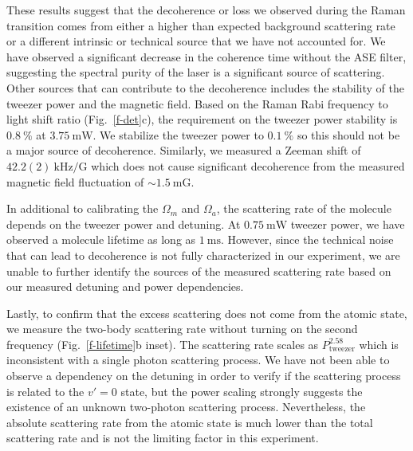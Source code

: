 \documentclass[aps,prl,twocolumn,10pt,superscriptaddress]{revtex4-1}
\newcommand{\todo}[1]{}
\begin{document}
\todo{change scattering to decoherence? since the fluctuation of light shift
  does not lead to scattering but only decherence.}
These results suggest that the decoherence or loss we observed during the Raman transition
comes from either a higher than expected background scattering rate
or a different intrinsic or technical source that we have not accounted for.
We have observed a significant decrease in the coherence time without the ASE filter,
suggesting the spectral purity of the laser is a significant source of scattering.
Other sources that can contribute to the decoherence includes
the stability of the tweezer power and the magnetic field.
Based on the Raman Rabi frequency to light shift ratio (Fig.~\ref{f-det}c),
the requirement on the tweezer power stability is $0.8~\mathrm{\%}$ at $3.75~\mathrm{mW}$.
We stabilize the tweezer power to $0.1~\mathrm{\%}$ so this should not be a major source
of decoherence.
Similarly, we measured a Zeeman shift of $42.2(2)~\mathrm{kHz/G}$
which does not cause significant decoherence from the measured magnetic field
fluctuation of $\sim1.5~\mathrm{mG}$.

In additional to calibrating the $\Omega_m$ and $\Omega_a$,
the scattering rate of the molecule depends on the tweezer power and detuning.
At $0.75~\mathrm{mW}$ tweezer power, we have observed
a molecule lifetime as long as $1~\mathrm{ms}$.
However, since the technical noise that can lead to decoherence
is not fully characterized in our experiment,
we are unable to further identify the sources of the measured scattering rate
based on our measured detuning and power dependencies.

Lastly, to confirm that the excess scattering does not come from the atomic state,
we measure the two-body scattering rate
without turning on the second frequency (Fig.~\ref{f-lifetime}b inset).
The scattering rate scales as $P_{\mathrm{tweezer}}^{2.58}$ which is inconsistent
with a single photon scattering process.
We have not been able to observe a dependency on the detuning in order to verify
if the scattering process is related to the $v'=0$ state,
but the power scaling strongly suggests the existence of an unknown two-photon scattering process.
Nevertheless, the absolute scattering rate from the atomic state
is much lower than the total scattering rate
and is not the limiting factor in this experiment.
\end{document}
